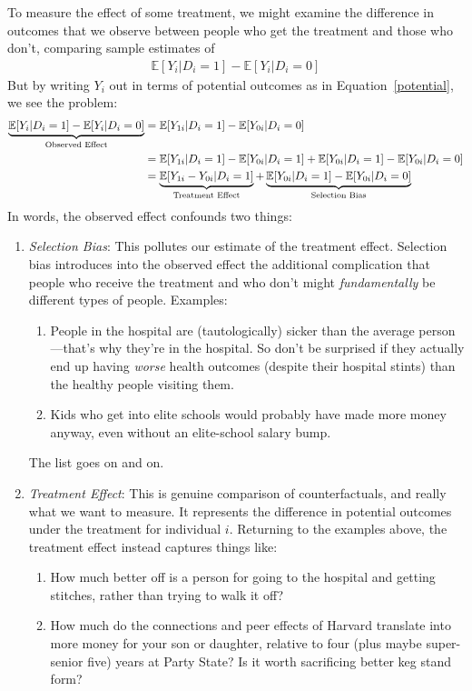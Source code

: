 \documentclass[12pt]{article}
\theoremstyle{plain}
\theoremstyle{definition}
\theoremstyle{remark}
\begin{document}
To measure the effect of some treatment, we might examine the difference
in outcomes that we observe between people who get the treatment and
those who don't, comparing sample estimates of
\begin{align*}
  \mathbb{E}[Y_i | D_i = 1] - \mathbb{E}[Y_i | D_i = 0]
\end{align*}
But by writing $Y_i$ out in terms of potential outcomes as in
Equation~\ref{potential}, we see the problem:
\begin{align}
  \underbrace{\mathbb{E}[Y_i | D_i = 1]
  - \mathbb{E}[Y_i | D_i = 0]}_{\text{Observed Effect}}
  &=
  \mathbb{E}[Y_{1i} | D_i = 1]
  - \mathbb{E}[Y_{0i} | D_i = 0] \notag\\
  &=
  \mathbb{E}[Y_{1i} | D_i = 1] - \mathbb{E}[Y_{0i} | D_i = 1]
  + \mathbb{E}[Y_{0i} | D_i = 1] - \mathbb{E}[Y_{0i} | D_i = 0] \notag\\
  &=
  \underbrace{\mathbb{E}[Y_{1i} - Y_{0i}| D_i = 1]}_{%
    \text{Treatment Effect}}
  + \underbrace{\mathbb{E}[Y_{0i} | D_i = 1]
  - \mathbb{E}[Y_{0i} | D_i = 0]}_{\text{Selection Bias}}
  \label{bias}
\end{align}
In words, the observed effect confounds two things:
\begin{enumerate}
  \item \emph{Selection Bias}: This pollutes our estimate of the
    treatment effect. Selection bias introduces into the observed effect
    the additional complication that people who receive the treatment
    and who don't might \emph{fundamentally} be different types of
    people. Examples:
    \begin{enumerate}
      \item People in the hospital are (tautologically) sicker than the
        average person---that's why they're in the hospital. So don't be
        surprised if they actually end up having \emph{worse} health
        outcomes (despite their hospital stints) than the healthy people
        visiting them.
      \item Kids who get into elite schools would probably have made
        more money anyway, even without an elite-school salary bump.
    \end{enumerate}
    The list goes on and on.
  \item \emph{Treatment Effect}: This is genuine comparison of
    counterfactuals, and really what we want to measure. It represents
    the difference in potential outcomes under the treatment for
    individual $i$. Returning to the examples above, the treatment
    effect instead captures things like:
    \begin{enumerate}
      \item How much better off is a person for going to the hospital
        and getting stitches, rather than trying to walk it off?
      \item How much do the connections and peer effects of Harvard
        translate into more money for your son or daughter, relative to
        four (plus maybe super-senior five) years at Party State? Is it
        worth sacrificing better keg stand form?
    \end{enumerate}
\end{enumerate}
\end{document}
